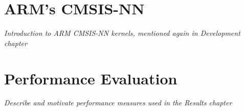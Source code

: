\section{ARM's CMSIS-NN}
\textit{Introduction to ARM CMSIS-NN kernels, mentioned again in Development chapter}

\section{Performance Evaluation}
\textit{Describe and motivate performance measures used in the Results chapter}
